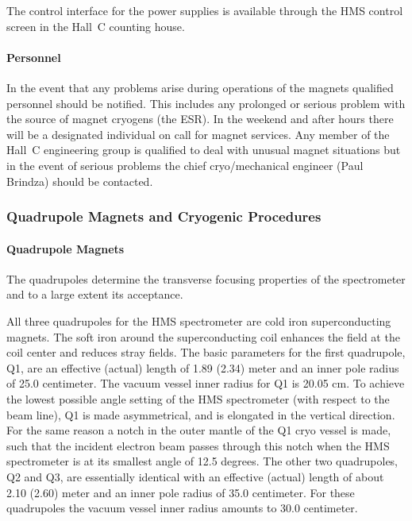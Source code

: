 The control interface for the power supplies is available through the HMS
control screen in the Hall~C counting house.

\paragraph{Personnel}
In the event that any problems arise during operations of the magnets
qualified personnel should be notified. This includes any prolonged
or serious problem with the source of magnet cryogens (the ESR).
In the weekend and after hours there
will be a designated individual on call for magnet services. Any member of
the Hall~C engineering group is qualified to deal with unusual magnet situations
but in the event of serious problems the chief cryo/mechanical engineer (Paul
Brindza) should be contacted.


\subsubsection{Quadrupole Magnets and Cryogenic Procedures}

\paragraph{Quadrupole Magnets}
The quadrupoles determine the transverse focusing properties of the spectrometer
and to a large extent its acceptance.

All three quadrupoles for the HMS spectrometer are cold iron superconducting
magnets. The soft iron around the superconducting coil enhances the field at
the coil center and reduces stray fields.
The basic parameters for the first quadrupole, Q1, are an effective (actual)
length of 1.89 (2.34) meter and an inner pole radius of
25.0 centimeter. \cite{bi:yan1}
The vacuum vessel
inner radius for Q1 is 20.05 cm. To achieve the lowest possible angle
setting of the HMS spectrometer (with respect to the beam line), Q1 is
made asymmetrical, and is elongated in the vertical direction. For the same
reason a notch in the outer mantle of the Q1 cryo vessel is made, such
that the incident electron beam passes through this notch when the
HMS spectrometer is at its smallest angle of 12.5 degrees.
The other two quadrupoles, Q2 and Q3, are essentially identical with an
effective (actual) length of about 2.10 (2.60) meter and an inner pole radius
of 35.0 centimeter. For these quadrupoles the vacuum vessel inner radius
amounts to 30.0 centimeter.


